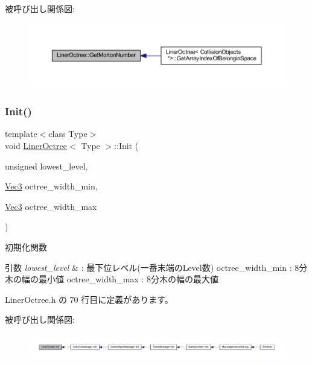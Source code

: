 被呼び出し関係図\+:\nopagebreak
\begin{figure}[H]
\begin{center}
\leavevmode
\includegraphics[width=350pt]{class_liner_octree_ad931e5f3ae94cd4337dd96d133ee42a8_icgraph}
\end{center}
\end{figure}
\mbox{\label{class_liner_octree_a715d655c722c00c002d0bb006d0600d8}} 
\subsubsection{\texorpdfstring{Init()}{Init()}}
{\footnotesize\ttfamily template$<$class Type$>$ \\
void \mbox{\hyperlink{class_liner_octree}{Liner\+Octree}}$<$ Type $>$\+::Init (\begin{DoxyParamCaption}\item[{unsigned}]{lowest\+\_\+level,  }\item[{\mbox{\hyperlink{_vector3_d_8h_ab16f59e4393f29a01ec8b9bbbabbe65d}{Vec3}}}]{octree\+\_\+width\+\_\+min,  }\item[{\mbox{\hyperlink{_vector3_d_8h_ab16f59e4393f29a01ec8b9bbbabbe65d}{Vec3}}}]{octree\+\_\+width\+\_\+max }\end{DoxyParamCaption})\hspace{0.3cm}{\ttfamily [inline]}}



初期化関数 


\begin{DoxyParams}{引数}
{\em lowest\+\_\+level} & \+: 最下位レベル(一番末端の\+Level数) octree\+\_\+width\+\_\+min \+: 8分木の幅の最小値 octree\+\_\+width\+\_\+max \+: 8分木の幅の最大値 \\
\hline
\end{DoxyParams}


 Liner\+Octree.\+h の 70 行目に定義があります。

被呼び出し関係図\+:
\nopagebreak
\begin{figure}[H]
\begin{center}
\leavevmode
\includegraphics[width=350pt]{class_liner_octree_a715d655c722c00c002d0bb006d0600d8_icgraph}
\end{center}
\end{figure}
\mbox{\label{class_liner_octree_acfa567ec0f969684f55443fc9ee98432}} 
